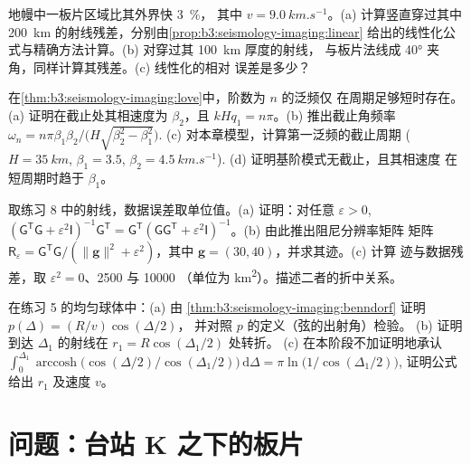 \begin{exercise}[$\star\star$]\label{exo:b3:seismology-imaging:9}
地幔中一板片区域比其外界快 \qty{3}{\percent}，
其中 $v = \qty{9.0}{km.s^{-1}}$。(a) 计算竖直穿过其中 \qty{200}{km}
的射线残差，分别由\cref{prop:b3:seismology-imaging:linear}
给出的线性化公式与精确方法计算。(b) 对穿过其 \qty{100}{km} 厚度的射线，
与板片法线成 \ang{40} 夹角，同样计算其残差。(c) 线性化的相对
误差是多少？
\end{exercise}

\begin{exercise}[$\star\star\star$]\label{exo:b3:seismology-imaging:10}
在\cref{thm:b3:seismology-imaging:love}中，阶数为 $n$ 的泛频仅
在周期足够短时存在。(a) 证明在截止处其相速度为
$\beta_2$，且 $kHq_1 = n\pi$。(b) 推出截止角频率
$\omega_n = n\pi\beta_1\beta_2/\bigl(H\sqrt{\beta_2^2 - \beta_1^2}\bigr)$.
  (c) 对本章模型，计算第一泛频的截止周期
($H = \qty{35}{km}$, $\beta_1 = 3.5$, $\beta_2 = \qty{4.5}{km.s^{-1}}$).
  (d) 证明基阶模式无截止，且其相速度
  在短周期时趋于 $\beta_1$。
\end{exercise}

\begin{exercise}[$\star\star\star$]\label{exo:b3:seismology-imaging:11}
取练习 8 中的射线，数据误差取单位值。(a) 证明：对任意
$\varepsilon > 0$, $(\mathsf G^{\mathsf T}\mathsf G + \varepsilon^2\mathsf
I)^{-1}\mathsf G^{\mathsf T} = \mathsf G^{\mathsf T}(\mathsf G\mathsf
G^{\mathsf T} + \varepsilon^2\mathsf I)^{-1}$。(b) 由此推出阻尼分辨率矩阵
矩阵 $\mathsf R_\varepsilon = \mathsf G^{\mathsf T}\mathsf G/(\|\mathbf g\|^2 +
\varepsilon^2)$，其中 $\mathbf g = (30, 40)$，并求其迹。(c) 计算
迹与数据残差，取 $\varepsilon^2 = 0$、2500 与 \num{10000}
（单位为 \unit{km^2}）。描述二者的折中关系。
\end{exercise}

\begin{exercise}[$\star\star\star$]\label{exo:b3:seismology-imaging:12}
在练习 5 的均匀球体中：(a) 由
\cref{thm:b3:seismology-imaging:benndorf} 证明 $p(\Delta) = (R/v)\cos(\Delta/2)$，
并对照 $p$ 的定义（弦的出射角）检验。
(b) 证明到达 $\Delta_1$ 的射线在 $r_1 = R\cos(\Delta_1/2)$ 处转折。
(c) 在本阶段不加证明地承认 $\int_0^{\Delta_1}\operatorname{arccosh}\bigl(\cos(\Delta/2)
/\cos(\Delta_1/2)\bigr)\,\mathrm d\Delta = \pi\ln\bigl(1/\cos(\Delta_1/2)\bigr)$,
证明公式给出 $r_1$ 及速度 $v$。
\end{exercise}

\section{问题：台站 K 之下的板片}

